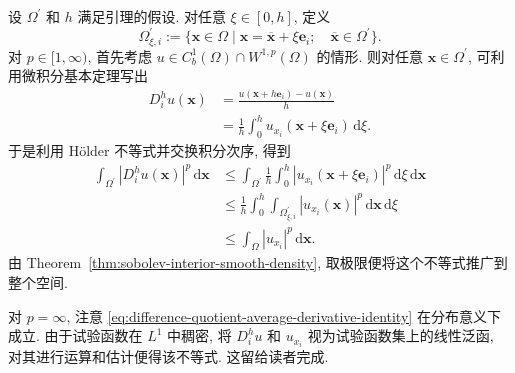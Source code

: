 \begin{Proof}
设 $\Omega^{\prime}$ 和 $h$ 满足引理的假设. 对任意 $\xi\in[0,h]$, 定义
\begin{equation}\label{eq:difference-quotient-translated-interior-domain}
\Omega_{\xi,i}^{\prime}:=\{\bm{x}\in\Omega\mid\bm{x}=\overline{\bm{x}}+\xi\bm{e}_i;\quad\overline{\bm{x}}\in\Omega^{\prime}\}.
\end{equation}
对 $p\in[1,\infty)$, 首先考虑 $u\in C_b^1(\Omega)\cap W^{1,p}(\Omega)$ 的情形. 则对任意 $\bm{x}\in\Omega^{\prime}$, 可利用微积分基本定理写出
\begin{equation}\label{eq:difference-quotient-average-derivative-identity}
\begin{aligned}
D_i^hu(\bm{x})&=\frac{u(\bm{x}+h\bm{e}_i)-u(\bm{x})}{h}\\
&=\frac{1}{h}\int_0^hu_{x_i}(\bm{x}+\xi\bm{e}_i)\,\mathrm{d}\xi.
\end{aligned}
\end{equation}
于是利用 Hölder 不等式并交换积分次序, 得到\[\begin{aligned}
\int_{\Omega^{\prime}}|D_i^hu(\bm{x})|^p\,\mathrm{d}\bm{x}
&\leq\int_{\Omega^{\prime}}\frac{1}{h}\int_0^h|u_{x_i}(\bm{x}+\xi\bm{e}_i)|^p\,\mathrm{d}\xi\,\mathrm{d}\bm{x}\\
&\leq\frac{1}{h}\int_0^h\int_{\Omega_{\xi,i}^{\prime}}|u_{x_i}(\bm{x})|^p\,\mathrm{d}\bm{x}\,\mathrm{d}\xi\\
&\leq\int_\Omega|u_{x_i}|^p\,\mathrm{d}\bm{x}.
\end{aligned}\]由 Theorem~\ref{thm:sobolev-interior-smooth-density}, 取极限便将这个不等式推广到整个空间.

对 $p=\infty$, 注意 \eqref{eq:difference-quotient-average-derivative-identity} 在分布意义下成立. 由于试验函数在 $L^1$ 中稠密, 将 $D_i^hu$ 和 $u_{x_i}$ 视为试验函数集上的线性泛函, 对其进行运算和估计便得该不等式. 这留给读者完成.
\end{Proof}
